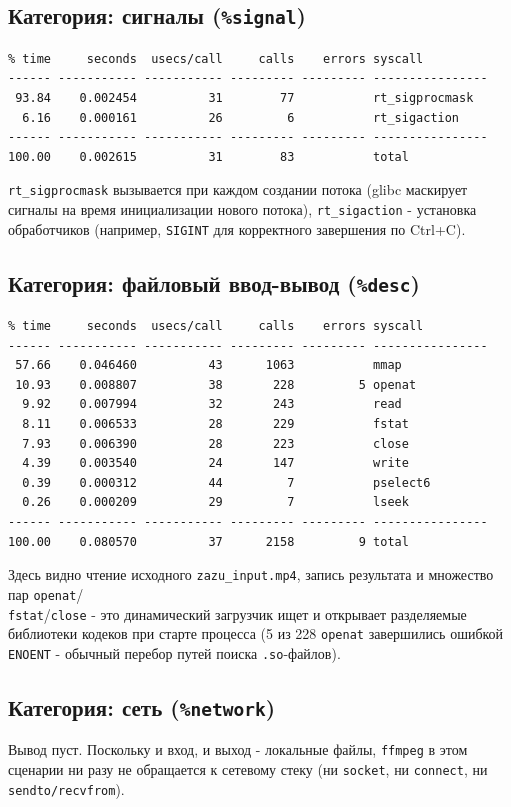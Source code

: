 \documentclass[12pt,a4paper]{article}
\begin{document}
\subsection{Категория: сигналы (\texttt{\%signal})}
\begin{lstlisting}
% time     seconds  usecs/call     calls    errors syscall
------ ----------- ----------- --------- --------- ----------------
 93.84    0.002454          31        77           rt_sigprocmask
  6.16    0.000161          26         6           rt_sigaction
------ ----------- ----------- --------- --------- ----------------
100.00    0.002615          31        83           total
\end{lstlisting}
\texttt{rt\_sigprocmask} вызывается при каждом создании потока (glibc маскирует
сигналы на время инициализации нового потока), \texttt{rt\_sigaction} - установка
обработчиков (например, \texttt{SIGINT} для корректного завершения по Ctrl+C).

\subsection{Категория: файловый ввод-вывод (\texttt{\%desc})}
\begin{lstlisting}
% time     seconds  usecs/call     calls    errors syscall
------ ----------- ----------- --------- --------- ----------------
 57.66    0.046460          43      1063           mmap
 10.93    0.008807          38       228         5 openat
  9.92    0.007994          32       243           read
  8.11    0.006533          28       229           fstat
  7.93    0.006390          28       223           close
  4.39    0.003540          24       147           write
  0.39    0.000312          44         7           pselect6
  0.26    0.000209          29         7           lseek
------ ----------- ----------- --------- --------- ----------------
100.00    0.080570          37      2158         9 total
\end{lstlisting}
Здесь видно чтение исходного \texttt{zazu\_input.mp4}, запись результата и 
множество пар \texttt{openat}/\\\texttt{fstat}/\texttt{close} - это динамический
загрузчик ищет и открывает разделяемые библиотеки кодеков при старте процесса
(5 из 228 \texttt{openat} завершились ошибкой \texttt{ENOENT} - обычный перебор
путей поиска \texttt{.so}-файлов).

\subsection{Категория: сеть (\texttt{\%network})}
Вывод пуст. Поскольку и вход, и выход - локальные файлы, \texttt{ffmpeg} в этом
сценарии ни разу не обращается к сетевому стеку (ни \texttt{socket}, ни
\texttt{connect}, ни \texttt{sendto/recvfrom}).
\end{document}
